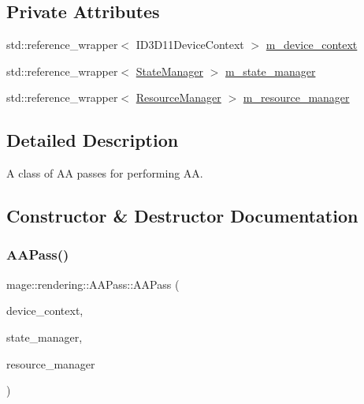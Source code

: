 \subsection*{Private Attributes}
\begin{DoxyCompactItemize}
\item 
std\+::reference\+\_\+wrapper$<$ I\+D3\+D11\+Device\+Context $>$ \mbox{\hyperlink{classmage_1_1rendering_1_1_a_a_pass_ae5421af4d2de6128ae24f4c6d5179c81}{m\+\_\+device\+\_\+context}}
\item 
std\+::reference\+\_\+wrapper$<$ \mbox{\hyperlink{classmage_1_1rendering_1_1_state_manager}{State\+Manager}} $>$ \mbox{\hyperlink{classmage_1_1rendering_1_1_a_a_pass_a7fea13d1b4462ef4b9b1f6d82ce5aac4}{m\+\_\+state\+\_\+manager}}
\item 
std\+::reference\+\_\+wrapper$<$ \mbox{\hyperlink{classmage_1_1rendering_1_1_resource_manager}{Resource\+Manager}} $>$ \mbox{\hyperlink{classmage_1_1rendering_1_1_a_a_pass_aaffba9ba685e4723220a6c04834f6d2f}{m\+\_\+resource\+\_\+manager}}
\end{DoxyCompactItemize}


\subsection{Detailed Description}
A class of AA passes for performing AA. 

\subsection{Constructor \& Destructor Documentation}
\mbox{\label{classmage_1_1rendering_1_1_a_a_pass_a691e1f111a4a28b0b734018551c6f418}} 
\subsubsection{\texorpdfstring{A\+A\+Pass()}{AAPass()}\hspace{0.1cm}{\footnotesize\ttfamily [1/3]}}
{\footnotesize\ttfamily mage\+::rendering\+::\+A\+A\+Pass\+::\+A\+A\+Pass (\begin{DoxyParamCaption}\item[{I\+D3\+D11\+Device\+Context \&}]{device\+\_\+context,  }\item[{\mbox{\hyperlink{classmage_1_1rendering_1_1_state_manager}{State\+Manager}} \&}]{state\+\_\+manager,  }\item[{\mbox{\hyperlink{classmage_1_1rendering_1_1_resource_manager}{Resource\+Manager}} \&}]{resource\+\_\+manager }\end{DoxyParamCaption})\hspace{0.3cm}{\ttfamily [explicit]}}

